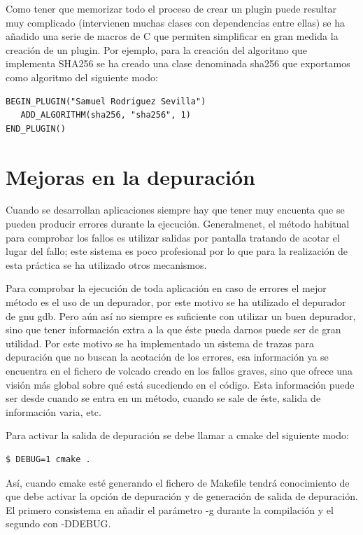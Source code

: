 Como tener que memorizar todo el proceso de crear un plugin puede resultar muy complicado (intervienen muchas clases con dependencias entre ellas) se ha añadido una serie de macros de C que permiten simplificar en gran medida la creación de un plugin. Por ejemplo, para la creación del algoritmo que implementa SHA256 se ha creado una clase denominada sha256 que exportamos como algoritmo del siguiente modo:

\begin{verbatim}
BEGIN_PLUGIN("Samuel Rodriguez Sevilla")
   ADD_ALGORITHM(sha256, "sha256", 1)
END_PLUGIN()
\end{verbatim}


\section{Mejoras en la depuración}

Cuando se desarrollan aplicaciones siempre hay que tener muy encuenta que se pueden producir errores durante la ejecución. Generalmenet, el método habitual para comprobar los fallos es utilizar salidas por pantalla tratando de acotar el lugar del fallo; este sistema es poco profesional por lo que para la realización de esta práctica se ha utilizado otros mecanismos.

Para comprobar la ejecución de toda aplicación en caso de errores el mejor método es el uso de un depurador, por este motivo se ha utilizado el depurador de gnu gdb. Pero aún así no siempre es suficiente con utilizar un buen depurador, sino que tener información extra a la que éste pueda darnos puede ser de gran utilidad. Por este motivo se ha implementado un sistema de trazas para depuración que no buscan la acotación de los errores, esa información ya se encuentra en el fichero de volcado creado en los fallos graves, sino que ofrece una visión más global sobre qué está sucediendo en el código. Esta información puede ser desde cuando se entra en un método, cuando se sale de éste, salida de información varia, etc.

Para activar la salida de depuración se debe llamar a cmake del siguiente modo:
\begin{verbatim}
$ DEBUG=1 cmake .
\end{verbatim}

Así, cuando cmake esté generando el fichero de Makefile tendrá conocimiento de que debe activar la opción de depuración y de generación de salida de depuración. El primero consistema en añadir el parámetro -g durante la compilación y el segundo con -DDEBUG.

